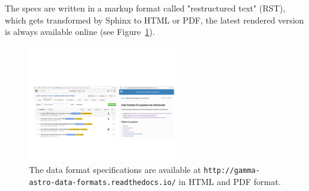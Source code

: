 The specs are written in a markup format called "restructured text" (RST),
which gets transformed by Sphinx to HTML or PDF, the latest rendered version is always available online (see Figure~\ref{fig:webpage}).

\begin{figure}[tb]
  \centerline{\includegraphics[width=0.6\textwidth]{figures/webpage}}
  \caption{The data format specifications are available at \texttt{http://gamma-astro-data-formats.readthedocs.io/} in HTML and PDF format.}
  \label{fig:webpage}
\end{figure}
